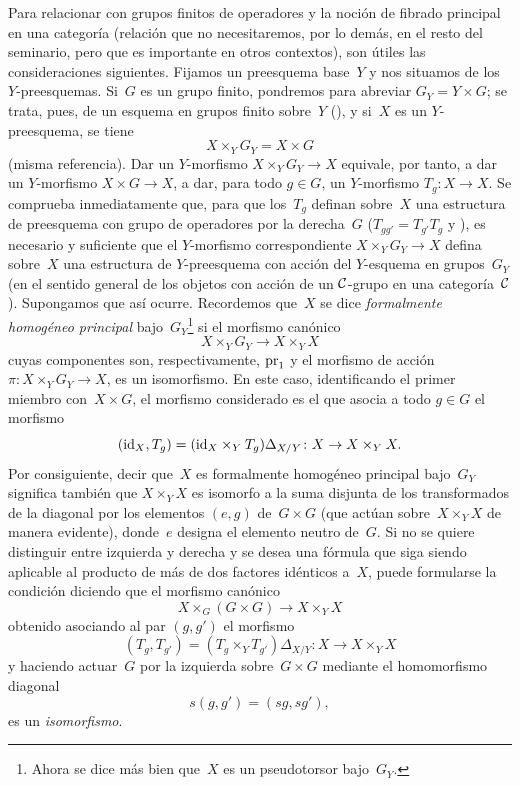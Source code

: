 Para relacionar
con grupos finitos de operadores y la noción de fibrado principal en una
categoría (relación que no necesitaremos, por lo demás, en el resto del
seminario, pero que es importante en otros contextos), son útiles las
consideraciones siguientes. Fijamos un preesquema base~$Y$ y nos situamos
de los $Y$-preesquemas. Si~$G$ es un grupo
finito, pondremos para abreviar $G_Y=Y\times G$; se trata, pues, de un
esquema en grupos finito sobre~$Y$ (\cf {}), y si~$X$ es un
$Y$-preesquema, se tiene
$$
X\times_YG_Y=X\times G
$$
(misma referencia). Dar un $Y$-morfismo $X\times_YG_Y\to X$ equivale, por
tanto, a dar un $Y$-morfismo $X\times G\to X$, \ie a dar, para todo
$g\in G$, un $Y$-morfismo $T_g\colon X\to X$. Se comprueba inmediatamente
que, para que los~$T_g$ definan sobre~$X$ una estructura de preesquema con
grupo de operadores por la derecha~$G$ (\ie $T_{gg'}=T_{g'}T_g$ y
),
es necesario y suficiente que el $Y$-morfismo correspondiente
$X\times_YG_Y\to X$ defina sobre~$X$ una estructura de $Y$-preesquema con
acción del $Y$-esquema en grupos~$G_Y$ (en el sentido general de los objetos
con acción de un $\cal{C}$-grupo en una categoría~$\cal{C}$). Supongamos que
así ocurre. Recordemos que~$X$ se dice \emph{formalmente homogéneo principal}
%
bajo~$G_Y$\kern1pt\footnote{Ahora se dice más bien que~$X$ es un
pseudotorsor bajo~$G_Y$.} si el morfismo canónico
$$
X\times_YG_Y\to X\times_YX
$$
cuyas componentes son, respectivamente, $\pr_1$ y el morfismo de acción
$\pi\colon X\times_YG_Y\to X$, es un isomorfismo. En este caso,
identificando el primer miembro con~$X\times G$, el morfismo considerado es
el que asocia a todo $g\in G$ el morfismo
$$
(\id_X,T_g)=(\id_X\times_YT_g)\Delta_{X/Y}\colon X\to X\times_YX.
$$
Por consiguiente, decir que~$X$ es formalmente homogéneo principal bajo~$G_Y$
significa también que $X\times_YX$ es isomorfo a la suma disjunta de los
transformados de la diagonal por los elementos $(e,g)$ de~$G\times G$ (que
actúan sobre~$X\times_YX$ de manera evidente), donde~$e$ designa el elemento
neutro de~$G$. Si no se quiere distinguir entre izquierda y derecha y se
desea una fórmula que siga siendo aplicable al producto de más de dos
factores idénticos a~$X$, puede formularse la condición diciendo que el
morfismo canónico
$$
X\times_G(G\times G)\to X\times_YX
$$
obtenido asociando al par $(g,g')$ el morfismo
$$
(T_g,T_{g'})=(T_g\times_YT_{g'})\Delta_{X/Y}\colon X\to X\times_YX
$$
y haciendo actuar~$G$ por la izquierda sobre~$G\times G$ mediante el
homomorfismo diagonal
$$
s(g,g')=(sg,sg'),
$$
es un \emph{isomorfismo}.

